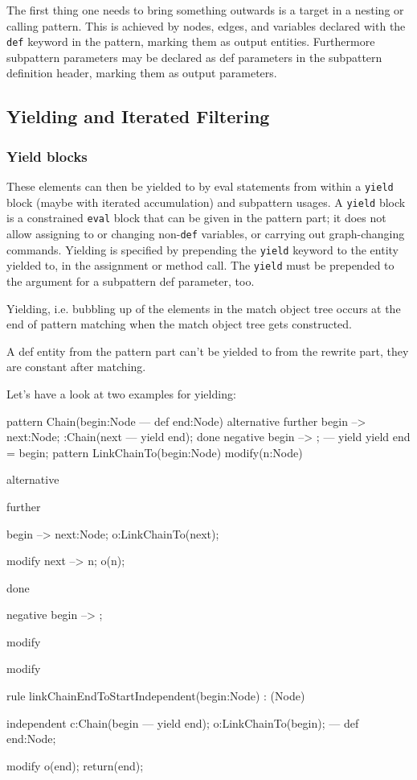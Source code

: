 The first thing one needs to bring something outwards is a target in a nesting or calling pattern. 
This is achieved by nodes, edges, and variables declared with the \texttt{def} keyword in the pattern, marking them as output entities.
Furthermore subpattern parameters may be declared as def parameters in the subpattern definition header,
marking them as output parameters.

\subsection{Yielding and Iterated Filtering} 

\subsubsection*{Yield blocks} 

These elements can then be yielded to by eval statements from within a \texttt{yield} block
(maybe with iterated accumulation) and subpattern usages.
A \texttt{yield} block is a constrained \texttt{eval} block that can be given in the pattern part;
it does not allow assigning to or changing non-\texttt{def} variables, or carrying out graph-changing commands.
Yielding is specified by prepending the \texttt{yield} keyword to the entity yielded to,
in the assignment or method call.
The \texttt{yield} must be prepended to the argument for a subpattern def parameter, too.

Yielding, i.e. bubbling up of the elements in the match object tree occurs at the end of pattern matching when the match object tree gets constructed.

\begin{warning}
A def entity from the pattern part can't be yielded to from the rewrite part, they are constant after matching.
\end{warning}

Let's have a look at two examples for yielding:

\begin{example}
  \begin{grgen}
pattern Chain(begin:Node --- def end:Node)
{
  alternative {
    further {
      begin --> next:Node;
      :Chain(next --- yield end);
    }
    done {
      negative {
        begin --> ;
      }
      ---
      yield {
        yield end = begin;
      }
    }
  }
}
pattern LinkChainTo(begin:Node) modify(n:Node)
{
  alternative {
    further {
      begin --> next:Node;
      o:LinkChainTo(next);

      modify {
        next --> n;
        o(n);
      }
    }
    done {
      negative {
        begin --> ;
      }

      modify {
      }
    }
  }

  modify { }
}
rule linkChainEndToStartIndependent(begin:Node) : (Node)
{	
  independent {
    c:Chain(begin --- yield end);
  }
  o:LinkChainTo(begin);
--- 
  def end:Node;

  modify {
    o(end);
    return(end);
  }
}
  \end{grgen}
\end{example}

